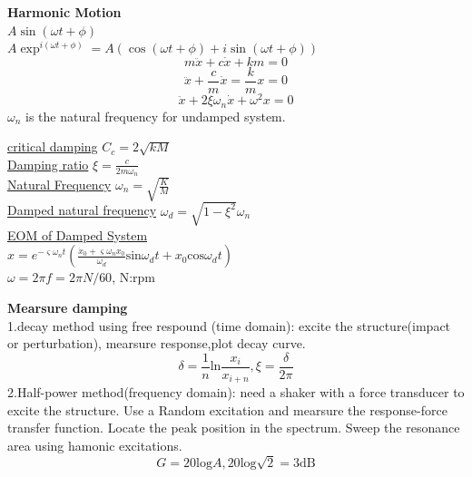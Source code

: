 \documentclass{article}
\begin{document}
\thispagestyle{empty}
\begin{multicols}{3}

  \noindent\textbf{Harmonic Motion}\\
  $A \sin(\omega t + \phi)$\\
  $A \exp^{i(\omega t + \phi)} = A(\cos(\omega t + \phi) + i\sin(\omega t + \phi))$\\
  \begin{equation*}
    m\ddot{x}+c\dot{x}+km=0
  \end{equation*}
\begin{equation*}
  \ddot{x}+\frac{c}{m}\dot{x}=\frac{k}{m}x=0
\end{equation*}
\begin{equation*}
  \ddot{x}+2\xi\omega_{n}\dot{x}+\omega^{2}x=0
\end{equation*}
$\omega_{n}$ is the natural frequency for undamped system.

  \underline{critical damping} $C_{c}=2\sqrt{kM}$\\
  \underline{Damping ratio} $\xi =\frac{c}{2m\omega_{n}}$\\
  \underline{Natural Frequency} $\omega_{n}=\sqrt{\frac{K}{M}}$\\
  \underline{Damped natural frequency} $\omega_{d}=\sqrt{1-\xi^{2}}\omega_{n}$\\
  \underline{EOM of Damped System}\\
  $x=e^{-\varsigma \omega_{n}t} (\frac{\dot{x}_{0}+\varsigma \omega_{n}x_{0}}{\omega_{d}}\text{sin}\omega_{d}t+x_{0}\text{cos}\omega_{d}t)$\\
  $\omega=2\pi f=2\pi N/60$, N:rpm

\noindent\textbf{Mearsure damping}\\
1.decay method using free respound (time domain):
excite the structure(impact or perturbation), mearsure response,plot decay curve.
\begin{equation*}
  \delta=\frac{1}{n}\text{ln}\frac{x_{i}}{x_{i+n}}, \xi =\frac{\delta}{2\pi}
\end{equation*}
2.Half-power method(frequency domain): need a shaker with a force transducer to excite the structure. Use a Random excitation and mearsure the response-force transfer function. Locate the peak position in the spectrum.
Sweep the resonance area using hamonic excitations.
\begin{equation*}
  G=20\text{log}A,20\text{log}\sqrt{2}=3\text{dB}
\end{equation*}


\end{multicols}
\end{document}
